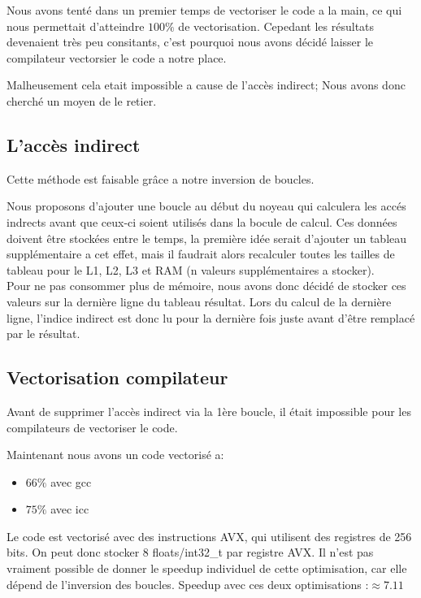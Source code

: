 Nous avons tenté dans un premier temps de vectoriser le code a la main, ce qui nous permettait d'atteindre $100\%$ de vectorisation.  Cepedant les résultats devenaient très peu consitants, c'est pourquoi nous avons décidé laisser le compilateur vectorsier le code a notre place.

Malheusement cela etait impossible a cause de l'accès indirect; Nous avons donc cherché un moyen de le retier.
\subsection*{L'accès indirect}
Cette méthode est faisable grâce a notre inversion de boucles.

Nous proposons d'ajouter une boucle au début du noyeau qui calculera les accés indrects avant que ceux-ci soient utilisés dans la bocule de calcul.
Ces données doivent être stockées entre le temps, la première idée serait d'ajouter un tableau supplémentaire a cet effet, mais il faudrait alors recalculer toutes les tailles de tableau pour le L1, L2, L3 et RAM (n valeurs supplémentaires a stocker).\\

Pour ne pas consommer plus de mémoire, nous avons donc décidé de stocker ces valeurs sur la dernière ligne du tableau résultat.
Lors du calcul de la dernière ligne, l'indice indirect est donc lu pour la dernière fois juste avant d'être remplacé par le résultat. 

\subsection*{Vectorisation compilateur}

Avant de supprimer l'accès indirect via la 1ère boucle, il était impossible pour les compilateurs de vectoriser le code.

Maintenant nous avons un code vectorisé a:
    \begin{itemize}
    \item{$66\%$ avec gcc}
    \item{$75\%$ avec icc}
    \end{itemize}

    Le code est vectorisé avec des instructions AVX, qui utilisent des registres de 256 bits. On peut donc stocker 8 floats/int32\_t par registre AVX.
    Il n'est pas vraiment possible de donner le speedup individuel de cette optimisation, car elle dépend de l'inversion des boucles.
Speedup avec ces deux optimisations :$\approx 7.11$
